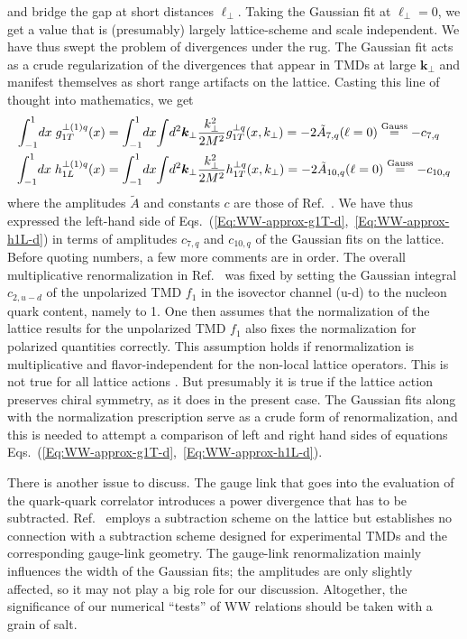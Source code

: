\documentclass[a4paper,11pt]{article}
\newcommand{\Gaussian}{\ensuremath{\stackrel{\text{\scriptsize Gauss}}{=}}}
\def\bflperp{{\bm \ell}_\perp}
\def\bfkperp{{\bm k}_\perp}
\def\kperp{k_\perp}
\begin{document}
and bridge the gap at short distances $\bflperp$.
Taking the Gaussian fit at $\bflperp = 0$, we get a value that is
(presumably) largely lattice-scheme and scale independent. We have thus
swept the problem of divergences under the rug. The Gaussian fit acts as
a crude regularization of the divergences that appear in TMDs at large
$\bfkperp$ and manifest themselves as short range artifacts on the lattice.
Casting this line of thought into mathematics, we get
\begin{align}
    	\int_{-1}^1 \! d x\; g_{1T}^{\perp(1)q}(x)
	&=  \int_{-1}^1 \! d x \! \int \! d^2 \bfkperp
	\frac{\kperp^2}{2M^2} g_{1T}^{\perp q}(x,\kperp)
	= -2 \tilde{A}_{7,q}( \ell = 0 )
	\Gaussian
	 -c_{7,q}  \\
    	\int_{-1}^1 \! d x\; h_{1L}^{\perp(1)q}(x)
	&=  \int_{-1}^1 \! d x \! \int \!  d^2 \bfkperp
	\frac{\kperp^2}{2M^2} h_{1T}^{\perp q}(x,\kperp)
	= -2 \tilde{A}_{10,q}( \ell = 0 )
	\Gaussian
	-c_{10,q} 
\end{align}
where the amplitudes $\tilde{A}$ and constants $c$ are those of Ref.~\cite{Musch:2010ka}.
We have thus expressed the left-hand side of
Eqs.~(\ref{Eq:WW-approx-g1T-d},~\ref{Eq:WW-approx-h1L-d}) in terms of
amplitudes $c_{7,q}$ and $c_{10,q}$ of the Gaussian fits on the lattice.
Before quoting numbers, a few more comments are in order. The overall
multiplicative renormalization in Ref.~\cite{Musch:2010ka} was fixed by
setting the Gaussian integral $c_{2,u-d}$ of the unpolarized TMD $f_1$
in the isovector channel (u-d) to the nucleon quark content, namely to 1.
One then assumes that the normalization of the lattice results for the
unpolarized TMD $f_1$ also fixes the normalization for polarized quantities
correctly. 
This assumption holds if renormalization is multiplicative and
   flavor-independent for the non-local lattice operators. This is
   not true for all lattice actions \cite{Yoon:2017qzo}.    But presumably it is true
   if the lattice action preserves chiral symmetry, as it does in
   the present case.
The Gaussian fits along with the normalization prescription serve as
a crude form of renormalization, and this is needed to attempt
a comparison of left and right hand sides of equations
Eqs.~(\ref{Eq:WW-approx-g1T-d},~\ref{Eq:WW-approx-h1L-d}).

There is another issue to discuss.
The gauge link that goes into the evaluation of the quark-quark correlator
introduces a power divergence that has to be subtracted.
Ref.~\cite{Musch:2010ka} employs a subtraction scheme on the lattice
but establishes no connection with a subtraction scheme designed for
experimental TMDs and the corresponding gauge-link geometry.
The gauge-link renormalization mainly
influences the width of the Gaussian fits; the amplitudes are only slightly
affected, so it may not play a big role for our discussion. Altogether, the
significance of our numerical ``tests'' of WW relations should be taken
with a grain of salt.
\end{document}

